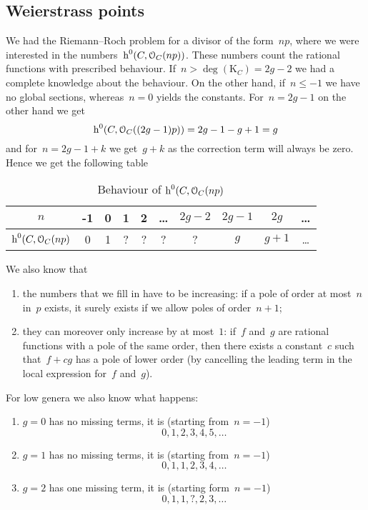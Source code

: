 \documentclass[10pt,a4paper]{article}
\begin{document}
\subsection{Weierstrass points}
We had the Riemann--Roch problem for a divisor of the form~$np$, where we were interested in the numbers~$\operatorname{h}^0(C,\mathcal{O}_C(np))$. These numbers count the rational functions with prescribed behaviour. If~$n>\deg(\mathrm{K}_C)=2g-2$ we had a complete knowledge about the behaviour. On the other hand, if~$n\leq -1$ we have no global sections, whereas~$n=0$ yields the constants. For~$n=2g-1$ on the other hand we get
\begin{equation}
  \operatorname{h}^0(C,\mathcal{O}_C((2g-1)p))=2g-1-g+1=g
\end{equation}
and for~$n=2g-1+k$ we get~$g+k$ as the correction term will always be zero. Hence we get the following table
\begin{table}
  \centering
  \begin{tabular}{cccccccccc}
    $n$ & -1 & 0 & 1 & 2 & \dots & $2g-2$ & $2g-1$ & $2g$ & \dots \\\midrule
    $\operatorname{h}^0(C,\mathcal{O}_C(np)$ & 0 & 1 & ? & ? & ? & ? & $g$ & $g+1$ & \dots
  \end{tabular}
  \caption{Behaviour of $\operatorname{h}^0(C,\mathcal{O}_C(np)$}
  \label{table:np}
\end{table}
We also know that
\begin{enumerate}
  \item the numbers that we fill in have to be increasing: if a pole of order at most~$n$ in~$p$ exists, it surely exists if we allow poles of order~$n+1$;
  \item they can moreover only increase by at most~$1$: if~$f$ and~$g$ are rational functions with a pole of the same order, then there exists a constant~$c$ such that~$f+cg$ has a pole of lower order (by cancelling the leading term in the local expression for~$f$ and~$g$).
\end{enumerate}
For low genera we also know what happens:
\begin{enumerate}
  \item $g=0$ has no missing terms, it is (starting from~$n=-1$)
    \begin{equation}
      0, 1, 2, 3, 4, 5, \dotsc
    \end{equation}
  \item $g=1$ has no missing terms, it is (starting from~$n=-1$) 
    \begin{equation}
      0, 1, 1, 2, 3, 4, \dotsc
    \end{equation}
  \item $g=2$ has one missing term, it is (starting form~$n=-1$)
    \begin{equation}
      0, 1, 1, ? , 2, 3, \dotsc
    \end{equation}
\end{enumerate}
\end{document}
